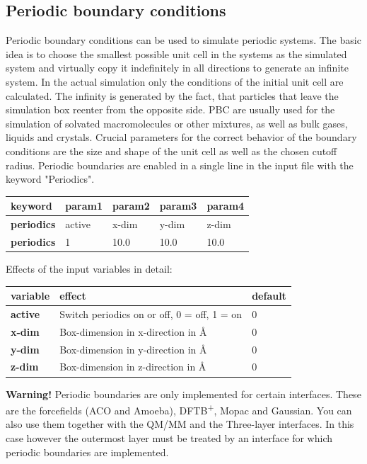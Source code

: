 \documentclass[10pt,a4paper]{article} %
\begin{document}
	\subsection{Periodic boundary conditions}
	Periodic boundary conditions can be used to simulate periodic systems. The basic idea is to choose the smallest possible unit cell in the systems as the simulated system and virtually copy it indefinitely in all directions to generate an infinite system. In the actual simulation only the conditions of the initial unit cell are calculated. The infinity is generated by the fact, that particles that leave the simulation box reenter from the opposite side. \acf{PBC} are usually used for the simulation of solvated macromolecules or other mixtures, as well as bulk gases, liquids and crystals. Crucial parameters for the correct behavior of the boundary conditions are the size and shape of the unit cell as well as the chosen cutoff radius. Periodic boundaries are enabled in a single line in the input file with the keyword "Periodics".\\
	\begin{longtable}{l|l|l|l|l}
		\textbf{keyword} & param1 & param2 & param3 & param4 \\
		\hline
		\textbf{periodics} & active & x-dim & y-dim & z-dim \\
		\textbf{periodics} & 1 & 10.0 & 10.0 & 10.0 \\
	\end{longtable}

	Effects of the input variables in detail:
	\begin{longtable}{|p{3cm}|p{6.5cm}|p{1.5cm}|}
		\textbf{variable} & effect & default \\
		\hline
		\textbf{active} & Switch periodics on or off, 0 = off, 1 = on & 0 \\
		\textbf{x-dim} & Box-dimension in x-direction in \AA & 0 \\
		\textbf{y-dim} & Box-dimension in y-direction in \AA & 0 \\
		\textbf{z-dim} & Box-dimension in z-direction in \AA & 0 \\
	\end{longtable}

    \textbf{Warning!} Periodic boundaries are only implemented for certain interfaces. These are the forcefields (ACO and Amoeba), DFTB\textsuperscript{+}, Mopac and Gaussian. You can also use them together with the QM/MM and the Three-layer interfaces. In this case however the outermost layer must be treated by an interface for which periodic boundaries are implemented.
    
\end{document}
